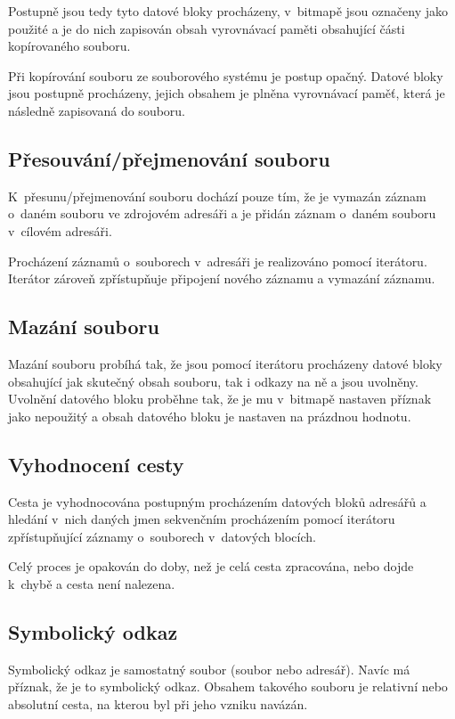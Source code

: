 \documentclass[a4paper, 12pt]{report}
\begin{document}
Postupně jsou tedy tyto datové bloky procházeny, v~bitmapě jsou označeny jako použité a je do nich zapisován obsah vyrovnávací paměti obsahující části kopírovaného souboru.

Při kopírování souboru ze souborového systému je postup opačný. Datové bloky jsou postupně procházeny, jejich obsahem je plněna vyrovnávací paměť, která je následně zapisovaná do souboru.

\subsection{Přesouvání/přejmenování souboru}

K~přesunu/přejmenování souboru dochází pouze tím, že je vymazán záznam o~daném souboru ve zdrojovém adresáři a je přidán záznam o~daném souboru v~cílovém adresáři.

Procházení záznamů o~souborech v~adresáři je realizováno pomocí iterátoru. Iterátor zároveň zpřístupňuje připojení nového záznamu a vymazání záznamu.

\subsection{Mazání souboru}

Mazání souboru probíhá tak, že jsou pomocí iterátoru procházeny datové bloky obsahující jak skutečný obsah souboru, tak i odkazy na ně a jsou uvolněny. Uvolnění datového bloku proběhne tak, že je mu v~bitmapě nastaven příznak jako nepoužitý a obsah datového bloku je nastaven na prázdnou hodnotu.

\subsection{Vyhodnocení cesty}

Cesta je vyhodnocována postupným procházením datových bloků adresářů a hledání v~nich daných jmen sekvenčním procházením pomocí iterátoru zpřístupňující záznamy o~souborech v~datových blocích.

Celý proces je opakován do doby, než je celá cesta zpracována, nebo dojde k~chybě a cesta není nalezena.

\subsection{Symbolický odkaz}

Symbolický odkaz je samostatný soubor (soubor nebo adresář). Navíc má příznak, že je to symbolický odkaz. Obsahem takového souboru je relativní nebo absolutní cesta, na kterou byl při jeho vzniku navázán.
\end{document}
